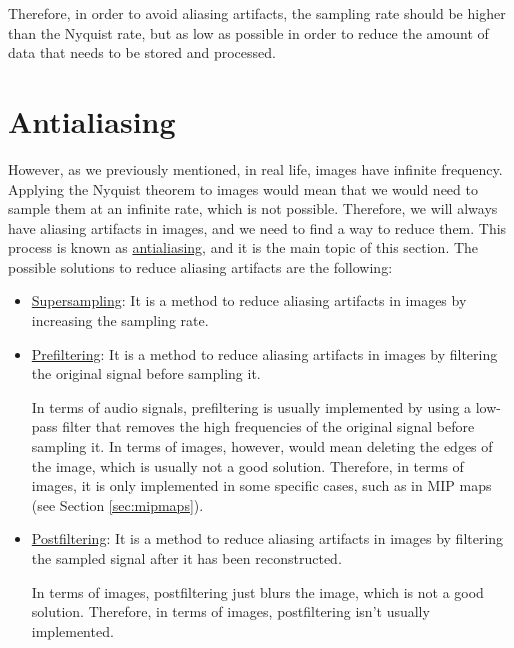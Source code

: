 Therefore, in order to avoid aliasing artifacts, the sampling rate should be higher than the Nyquist rate, but as low as possible in order to reduce the amount of data that needs to be stored and processed.

\section{Antialiasing}

However, as we previously mentioned, in real life, images have infinite frequency. Applying the Nyquist theorem to images would mean that we would need to sample them at an infinite rate, which is not possible. Therefore, we will always have aliasing artifacts in images, and we need to find a way to reduce them. This process is known as \ul{antialiasing}, and it is the main topic of this section. The possible solutions to reduce aliasing artifacts are the following:
\begin{itemize}
    \item \ul{Supersampling}: It is a method to reduce aliasing artifacts in images by increasing the sampling rate.

    \item \ul{Prefiltering}: It is a method to reduce aliasing artifacts in images by filtering the original signal before sampling it.
    
    In terms of audio signals, prefiltering is usually implemented by using a low-pass filter that removes the high frequencies of the original signal before sampling it. In terms of images, however, would mean deleting the edges of the image, which is usually not a good solution. Therefore, in terms of images, it is only implemented in some specific cases, such as in MIP maps (see Section \ref{sec:mipmaps}).

    \item \ul{Postfiltering}: It is a method to reduce aliasing artifacts in images by filtering the sampled signal after it has been reconstructed.
    
    In terms of images, postfiltering just blurs the image, which is not a good solution. Therefore, in terms of images, postfiltering isn't usually implemented.
\end{itemize}


